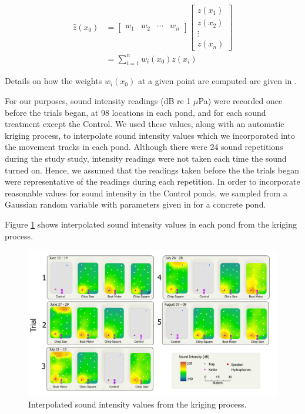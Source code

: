 \documentclass[12pt]{article}
\begin{document}
			\begin{align*}
				\hat z(x_0) &= \begin{bmatrix} w_1 & w_2 & \cdots & w_n \end{bmatrix} \begin{bmatrix} z(x_1) \\ z(x_2) \\ \vdots \\ z(x_n) \end{bmatrix} \\
				&= \sum_{i = 1}^n w_i(x_0) z(x_i)
			\end{align*}
			
			Details on how the weights $w_i(x_0)$ at a given point are computed are given in \cite{Bailey1995}.
			
			For our purposes, sound intensity readings (dB re 1 $\mu$Pa) were recorded once before the trials began, at 98 locations in each pond, and for each sound treatment except the Control. We used these values, along with an automatic kriging process, to interpolate sound intensity values which we incorporated into the movement tracks in each pond. Although there were 24 sound repetitions during the study study, intensity readings were not taken each time the sound turned on. Hence, we assumed that the readings taken before the the trials began were representative of the readings during each repetition. In order to incorporate reasonable values for sound intensity in the Control ponds, we sampled from a Gaussian random variable with parameters given in \cite{Wysocki2007} for a concrete pond.
			
			Figure \ref{img:intensities} shows interpolated sound intensity values in each pond from the kriging process.
			
			\begin{figure}[H]
				\includegraphics[width=\textwidth]{intensities.png}
				\caption{Interpolated sound intensity values from the kriging process.}
				\label{img:intensities}
			\end{figure}		
\end{document}
